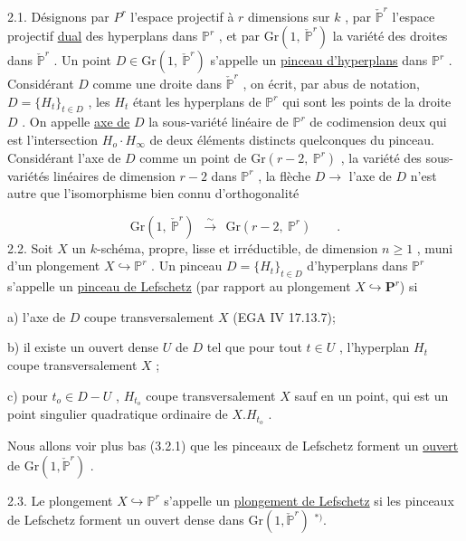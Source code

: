 2.1.    Désignons par $P^r$ l'espace projectif à $r$ dimensions sur $k$ , par $\check{\mathbb{P}}^r$ l'espace projectif \underline{dual} des hyperplans dans $\mathbb{P}^r$ , et par $\mathrm{Gr}(1,\ \check{\mathbb{P}}^r)$ la variété des droites dans $\check{\mathbb{P}}^r$ . Un point $D \in \mathrm{Gr}(1,\ \check{\mathbb{P}}^r)$ s'appelle un \underline{pinceau d'hyperplans} dans $\mathbb{P}^r$ . Considérant $D$ comme une droite dans $\check{\mathbb{P}}^r$ , on écrit, par abus de notation, $D = \{H_t\}_{t \in D}$ , les $H_t$ étant les hyperplans de $\mathbb{P}^r$ qui sont les points de la droite $D$ . On appelle \underline{axe de} $D$ la sous-variété linéaire de $\mathbb{P}^r$ de codimension deux qui est l'intersection $H_o \cdot H_\infty$ de deux éléments distincts quelconques du pinceau. Considérant l'axe de $D$ comme un point de $\mathrm{Gr}(r-2,\ \mathbb{P}^r)$ , la variété des sous-variétés linéaires de dimension $r-2$ dans $\mathbb{P}^r$ , la flèche $D \longrightarrow$ l'axe de $D$ n'est autre que l'isomorphisme bien connu d'orthogonalité

\begin{equation*}
\mathrm{Gr}(1,\ \check{\mathbb{P}}^r) \ \ \stackrel{\textstyle\sim}{\longrightarrow} \ \ \mathrm{Gr}(r-2,\ \mathbb{P}^r) \qquad .
\end{equation*}
2.2.    Soit $X$ un $k$-schéma, propre, lisse et irréductible, de dimension $n \geq 1$ , muni d'un plongement $X \hookrightarrow \mathbb{P}^r$ . Un pinceau $D = \{H_t\}_{t \in D}$ d'hyperplans dans $\mathbb{P}^r$ s'appelle un \underline{pinceau de Lefschetz}   (par rapport au plongement  $X \hookrightarrow \mathbf{P}^r$) si

a) l'axe de $D$ coupe transversalement $X$  (EGA IV 17.13.7);

b) il existe un ouvert dense $U$ de $D$ tel que pour tout $t \in U$ , l'hyperplan $H_t$ coupe transversalement $X$ ;

c) pour $t_o \in D-U$ , $H_{t_o}$ coupe transversalement $X$ sauf en
un point, qui est un point singulier quadratique ordinaire de  $X . H_{t_o}$  .

Nous allons voir plus bas (3.2.1) que les pinceaux de Lefschetz forment un  \underline{ouvert}  de  $\mathrm{Gr}(1, \check{\mathbb{P}}^r)$  .

2.3.    Le plongement  $X \hookrightarrow \mathbb{P}^r$  s'appelle un  \underline{plongement de Lefschetz} si les pinceaux de Lefschetz forment un ouvert dense dans $\mathrm{Gr}(1, \check{\mathbb{P}}^r)$ $^{*)}$.

